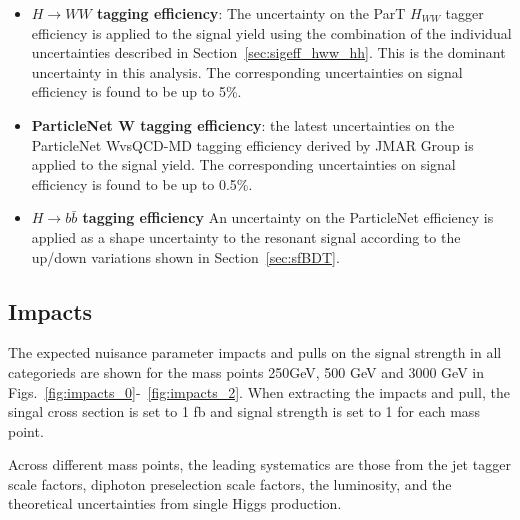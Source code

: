 \begin{itemize}
  \item \textbf{$H \rightarrow WW$ tagging efficiency}: The uncertainty on the ParT $H_{WW}$ tagger efficiency is applied to the signal yield using the combination of the individual uncertainties described in Section~\ref{sec:sigeff_hww_hh}. This is the dominant uncertainty in this analysis. The corresponding uncertainties on signal efficiency is found to be up to 5\%.
	\item \textbf{ParticleNet W tagging efficiency}: the latest uncertainties on the ParticleNet WvsQCD-MD tagging efficiency derived by JMAR Group \cite{Wtagger} \cite{CMS:wvsqcd} is applied to the signal yield. The corresponding uncertainties on signal efficiency is found to be up to 0.5\%.
  \item\textbf{\( H \to b\bar{b} \) tagging efficiency} An uncertainty on the ParticleNet \TXbb efficiency is applied as a shape uncertainty to the resonant signal according to the up/down variations shown in Section~\ref{sec:sfBDT}.
\end{itemize}

\subsection{Impacts}


The expected nuisance parameter impacts and pulls on the signal strength in all categorieds are shown for the mass points 250GeV, 500 GeV and 3000 GeV in Figs.~\ref{fig:impacts_0}-~\ref{fig:impacts_2}. When extracting the impacts and pull, the singal cross section is set to 1 fb and signal strength is set to 1 for each mass point.

Across different mass points, the leading systematics are those from the jet tagger scale factors, diphoton preselection scale factors, the luminosity, and the theoretical uncertainties from single Higgs production.


